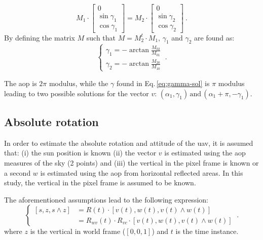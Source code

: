 \begin{equation}
  M_{1}\cdot
  \begin{bmatrix}
0\\
\sin\gamma_{1}\\
\cos\gamma_{1}
\end{bmatrix}
=M_{2}\cdot
\begin{bmatrix}
0\\
\sin\gamma_{2}\\
\cos\gamma_{2}
\end{bmatrix} \ .
\label{eq:2pts}
\end{equation}
By defining the matrix $M$ such that $M=M_{2}^{t}\cdot M_{1}$, $\gamma_1$ and
$\gamma_2$ are found as:
\begin{equation}
\begin{cases}
\gamma_{1}=-\arctan\frac{M_{02}}{M_{01}}\\
\gamma_{2}=-\arctan\frac{M_{20}}{M_{10}}
\end{cases} \ .
\label{eq:gamma-sol}
\end{equation}

The \gls{aop} is $2\pi$ modulus, while the $\gamma$ found in
Eq.\,\eqref{eq:gamma-sol} is $\pi$ modulus leading to two possible solutions
for the vector $v$:
$\left(\alpha_{1},\gamma_{1}\right)\,\text{and}\,\left(\alpha_{1}+\pi,-\gamma_{1}\right)$.

\subsection{Absolute rotation}
\label{sec:abs-rot}
In order to estimate the absolute rotation and attitude of the \gls{uav}, it is
assumed that: (i) the sun position is known (ii) the vector $v$ is estimated
using the \gls{aop} measures of the sky (2 points) and (iii) the vertical in
the pixel frame is known or a second $w$ is estimated using the \gls{aop} from
horizontal reflected areas. In this study, the vertical in the pixel frame is
assumed to be known.

The aforementioned assumptions lead to the following expression:
\begin{equation}
\begin{cases}
\left[s,z,s\wedge z\right] & =R(t)\cdot\left[v(t),w(t),v(t)\wedge w(t)\right]\\
 & =R_{wv}(t)\cdot R_{vc}\cdot\left[v(t),w(t),v(t)\wedge w(t)\right]
\end{cases} \ .
\label{eq:linear_equation}
\end{equation}
\noindent where $z$ is the vertical in world frame ($[0, 0, 1]$) and $t$ is the
time instance.

